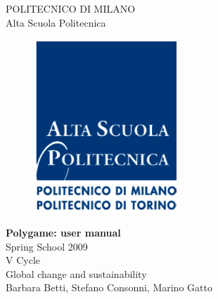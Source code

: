 \thispagestyle{empty}
\vspace*{-1.5cm}
\begin{center}
  \large
  POLITECNICO DI MILANO\\
  \normalsize
  Alta Scuola Politecnica\\
  \begin{figure}[htbp]
    \begin{center}
      \includegraphics[width=5.5cm]{../img/logoasp.png}
    \end{center}
  \end{figure}
  \vspace*{0.3cm} \LARGE



  \textbf{Polygame: user manual}\\



  \vspace*{.75truecm} \large
  Spring School 2009 \\
  V Cycle \\
  Global change and sustainability\\
  Barbara Betti, Stefano Consonni, Marino Gatto
  
\end{center}
\vspace*{2.0cm} \large
\begin{flushleft}



\end{flushleft}
